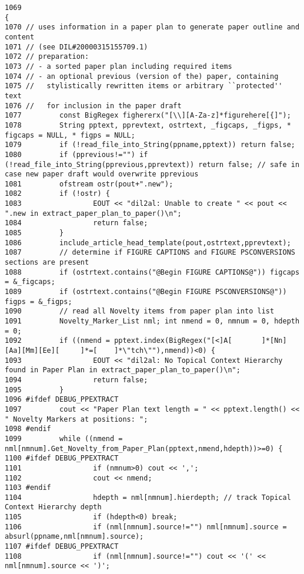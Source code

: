 \footnotesize\begin{verbatim}1069                                                                                {
1070 // uses information in a paper plan to generate paper outline and content
1071 // (see DIL#20000315155709.1)
1072 // preparation:
1073 // - a sorted paper plan including required items
1074 // - an optional previous (version of the) paper, containing
1075 //   stylistically rewritten items or arbitrary ``protected'' text
1076 //   for inclusion in the paper draft
1077         const BigRegex fighererx("[\\][A-Za-z]*figurehere[{]");
1078         String pptext, pprevtext, ostrtext, _figcaps, _figps, * figcaps = NULL, * figps = NULL;
1079         if (!read_file_into_String(ppname,pptext)) return false;
1080         if (pprevious!="") if (!read_file_into_String(pprevious,pprevtext)) return false; // safe in case new paper draft would overwrite pprevious
1081         ofstream ostr(pout+".new");
1082         if (!ostr) {
1083                 EOUT << "dil2al: Unable to create " << pout << ".new in extract_paper_plan_to_paper()\n";
1084                 return false;
1085         }
1086         include_article_head_template(pout,ostrtext,pprevtext);
1087         // determine if FIGURE CAPTIONS and FIGURE PSCONVERSIONS sections are present
1088         if (ostrtext.contains("@Begin FIGURE CAPTIONS@")) figcaps = &_figcaps;
1089         if (ostrtext.contains("@Begin FIGURE PSCONVERSIONS@")) figps = &_figps;
1090         // read all Novelty items from paper plan into list
1091         Novelty_Marker_List nml; int nmend = 0, nmnum = 0, hdepth = 0;
1092         if ((nmend = pptext.index(BigRegex("[<]A[       ]*[Nn][Aa][Mm][Ee][     ]*=[    ]*\"tch\""),nmend))<0) {
1093                 EOUT << "dil2al: No Topical Context Hierarchy found in Paper Plan in extract_paper_plan_to_paper()\n";
1094                 return false;
1095         }
1096 #ifdef DEBUG_PPEXTRACT
1097         cout << "Paper Plan text length = " << pptext.length() << " Novelty Markers at positions: ";
1098 #endif
1099         while ((nmend = nml[nmnum].Get_Novelty_from_Paper_Plan(pptext,nmend,hdepth))>=0) {
1100 #ifdef DEBUG_PPEXTRACT
1101                 if (nmnum>0) cout << ',';
1102                 cout << nmend;
1103 #endif
1104                 hdepth = nml[nmnum].hierdepth; // track Topical Context Hierarchy depth
1105                 if (hdepth<0) break;
1106                 if (nml[nmnum].source!="") nml[nmnum].source = absurl(ppname,nml[nmnum].source);
1107 #ifdef DEBUG_PPEXTRACT
1108                 if (nml[nmnum].source!="") cout << '(' << nml[nmnum].source << ')';

\end{verbatim}
